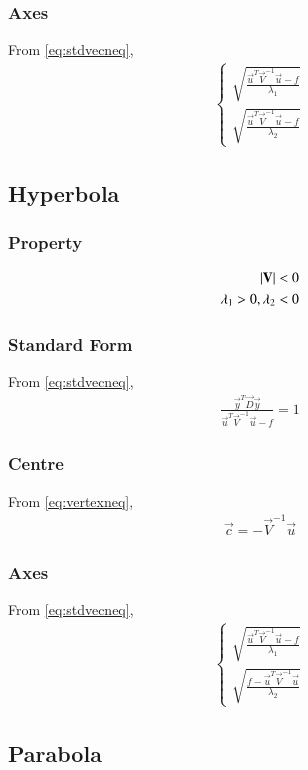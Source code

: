 \documentclass[journal,12pt,twocolumn]{IEEEtran}
\begin{document}
\subsubsection{Axes}
From \eqref{eq:stdvecneq},
\begin{align}
\begin{cases}
    \sqrt{\frac{\vec{u}^T\vec{V}^{-1}\vec{u}-f}{\lambda_1}}
    \\
    \sqrt{\frac{\vec{u}^T\vec{V}^{-1}\vec{u}-f}{\lambda_2}}
\end{cases}
\end{align}
\subsection{Hyperbola}

\subsubsection{Property}
\begin{align}
    \left\vert\mathbf{V}\right\vert < 0
    \\
    \lambda_1>0,\lambda_2<0
\end{align}
\subsubsection{Standard Form}
From \eqref{eq:stdvecneq},
\begin{align}
    \frac{\vec{y}^T\vec{D}\vec{y}}{\vec{u}^T\vec{V}^{-1}\vec{u}-f}=1
\end{align}
\subsubsection{Centre}
From \eqref{eq:vertexneq},
\begin{align}
    \vec{c} = -\vec{V}^{-1}\vec{u}
\end{align}
\subsubsection{Axes}
From \eqref{eq:stdvecneq},
\begin{align}
\begin{cases}
    \sqrt{\frac{\vec{u}^T\vec{V}^{-1}\vec{u}-f}{\lambda_1}}
    \\
    \sqrt{\frac{f-\vec{u}^T\vec{V}^{-1}\vec{u}}{\lambda_2}}
\end{cases}
\end{align}

\subsection{Parabola}
\end{document}
